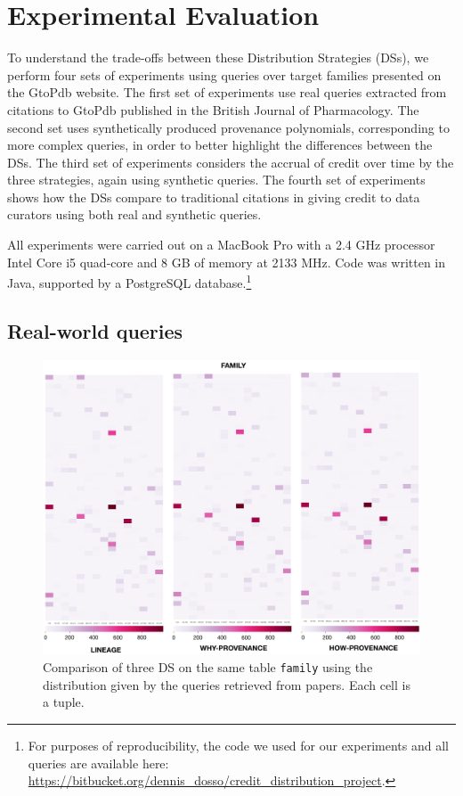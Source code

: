 \section{Experimental Evaluation}
\label{sec:experiments}
To understand the trade-offs between these Distribution Strategies (DSs), we perform four sets of experiments using queries over target families presented on the GtoPdb website. The first set of experiments use real queries extracted from citations to GtoPdb published in the British Journal of Pharmacology.  
The second set uses synthetically produced provenance polynomials, corresponding to more complex queries, in order to better highlight the differences between the DSs.
The third set of experiments considers the accrual of credit over time by the three strategies, again using synthetic queries.
The fourth set of experiments shows how the DSs compare to traditional citations in giving credit to data curators using both real and synthetic queries.

All experiments were carried out on a MacBook Pro %
with a 2.4 GHz processor Intel Core i5 quad-core and 8 GB of memory at 2133 MHz.  Code was written in Java, supported by a PostgreSQL database.\footnote{For purposes of reproducibility, the code we used for our experiments and all queries are available here: \url{https://bitbucket.org/dennis_dosso/credit_distribution_project}.}

\subsection{Real-world queries}
\label{sec:real_world_queries}

\begin{figure}[t]
  \includegraphics[width=1\textwidth]{figures/paper_based}
  \caption{Comparison of three DS on the same table \texttt{family} using the distribution given by the queries retrieved from papers. Each cell is a tuple.}
  \label{figure:comparison_on_papers}
\end{figure}


